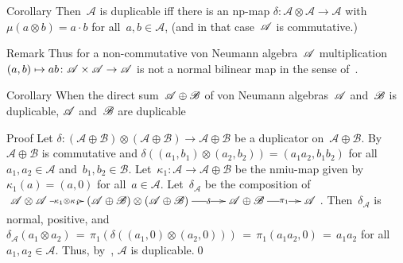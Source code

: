 \documentclass[a]{subfiles}
\begin{document}
\begin{parsec}
\begin{point}{Corollary}
Then~$\mathscr{A}$
is duplicable
iff there is
an np-map $\delta\colon\mathscr{A}\otimes\mathscr{A}
\to \mathscr{A}$
with $\mu(a\otimes b)=a\cdot b$ 
for all~$a,b\in\mathscr{A}$,
(and in that case~$\mathscr{A}$ is commutative.)
\begin{point}{Remark}%
Thus
for a non-commutative von Neumann algebra~$\mathscr{A}$ 
multiplication $(a,b)\mapsto ab\colon \mathscr{A}\times \mathscr{A}\to\mathscr{A}$
is not a normal bilinear map
in the sense of~.
\end{point}
\end{point}
\begin{point}{Corollary}%
When the direct sum~$\mathscr{A}\oplus\mathscr{B}$
of von Neumann algebras~$\mathscr{A}$ and~$\mathscr{B}$
is duplicable,
$\mathscr{A}$ and~$\mathscr{B}$ are duplicable
\begin{point}{Proof}%
Let $\delta\colon (\mathscr{A}\oplus\mathscr{B})\otimes
(\mathscr{A}\oplus\mathscr{B})\longrightarrow
\mathscr{A}\oplus\mathscr{B}$
be a duplicator on~$\mathscr{A}\oplus\mathscr{B}$.
By~
$\mathscr{A}\oplus\mathscr{B}$
is commutative
and $\delta((a_1,b_1)\otimes (a_2,b_2))
= (a_1a_2,b_1b_2)$
for all $a_1,a_2\in\mathscr{A}$
and~$b_1,b_2\in\mathscr{B}$.
Let~$\kappa_1\colon \mathscr{A}\to\mathscr{A}\oplus\mathscr{B}$
be the nmiu-map
given by~$\kappa_1(a)=(a,0)$ for all~$a\in\mathscr{A}$.
Let~$\delta_\mathscr{A}$ be the composition of
$\xymatrix@C=3em{
\mathscr{A}\otimes\mathscr{A}
\ar[r]|-{\kappa_1\otimes\kappa_1}
&
(\mathscr{A}\oplus\mathscr{B})
\otimes
(\mathscr{A}\oplus\mathscr{B})
\ar[r]|-{\delta}
&
\mathscr{A}\oplus\mathscr{B}
\ar[r]|-{\pi_1}
&
\mathscr{A}
}$.
Then~$\delta_\mathscr{A}$ is normal, positive,
and
$\delta_\mathscr{A}(a_1\otimes a_2)
\,=\,  \pi_1(\delta((a_1,0)\otimes (a_2,0))) 
\,=\, \pi_1(a_1a_2,0)\,=\,a_1a_2$
for all~$a_1,a_2\in\mathscr{A}$.
Thus, by~,
$\mathscr{A}$
is duplicable.\qed
\end{point}
\end{point}
\end{parsec}
\end{document}
